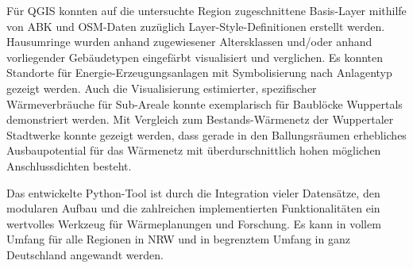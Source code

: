 		Für QGIS konnten auf die untersuchte Region zugeschnittene Basis-Layer mithilfe von ABK und OSM-Daten zuzüglich Layer-Style-Definitionen erstellt werden. Hausumringe wurden anhand zugewiesener Altersklassen und/oder anhand vorliegender Gebäudetypen eingefärbt visualisiert und verglichen. Es konnten Standorte für Energie-Erzeugungsanlagen mit Symbolisierung nach Anlagentyp gezeigt werden. Auch die Visualisierung estimierter, spezifischer Wärmeverbräuche für Sub-Areale konnte exemplarisch für Baublöcke Wuppertals demonstriert werden. Mit Vergleich zum Bestands-Wärmenetz der Wuppertaler Stadtwerke konnte gezeigt werden, dass gerade in den Ballungsräumen erhebliches Ausbaupotential für das Wärmenetz mit überdurschnittlich hohen möglichen Anschlussdichten besteht.
		
		Das entwickelte Python-Tool ist durch die Integration vieler Datensätze, den modularen Aufbau und die zahlreichen implementierten Funktionalitäten ein wertvolles Werkzeug für Wärmeplanungen und Forschung. Es kann in vollem Umfang für alle Regionen in NRW und in begrenztem Umfang in ganz Deutschland angewandt werden. 
		

	
		
		
